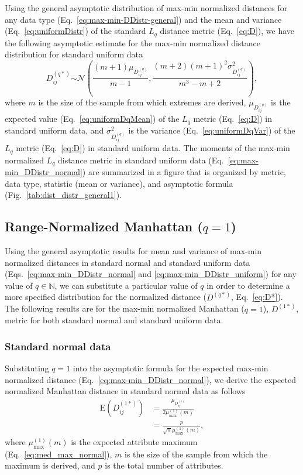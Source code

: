 \documentclass[10pt,letterpaper]{article}
\begin{document}
Using the general asymptotic distribution of max-min normalized distances for any data type (Eq.~\ref{eq:max-min-DDistr-general}) and the mean and variance (Eq.~\ref{eq:uniformDistr}) of the standard $L_q$ distance metric (Eq.~\ref{eq:D}), we have the following asymptotic estimate for the max-min normalized distance distribution for standard uniform data
%
\begin{equation}\label{eq:max-min_DDistr_uniform}
D^{(q*)}_{ij} \overset{.}{\sim} \mathcal{N}\left(\frac{(m+1)\mu_{D^{(q)}_{ij}}}{m-1}, \frac{(m+2)(m+1)^2 \sigma^2_{D^{(q)}_{ij}}}{m^3 - m + 2}\right),
\end{equation}
%
where $m$ is the size of the sample from which extremes are derived, $\mu_{D^{(q)}_{ij}}$ is the expected value (Eq.~\ref{eq:uniformDqMean}) of the $L_q$ metric (Eq.~\ref{eq:D}) in standard uniform data, and $\sigma^2_{D^{(q)}_{ij}}$ is the variance (Eq.~\ref{eq:uniformDqVar}) of the $L_q$ metric (Eq.~\ref{eq:D}) in standard uniform data. The moments of the max-min normalized $L_q$ distance metric in standard uniform data (Eq.~\ref{eq:max-min_DDistr_normal}) are summarized in a figure that is organized by metric, data type, statistic (mean or variance), and asymptotic formula (Fig.~\ref{tab:dist_distr_general1}).

\subsection{Range-Normalized Manhattan \texorpdfstring{($q=1$)}{}}

Using the general asymptotic results for mean and variance of max-min normalized distances in standard normal and standard uniform data (Eqs.~\ref{eq:max-min_DDistr_normal} and \ref{eq:max-min_DDistr_uniform}) for any value of $q \in \mathbb{N}$, we can substitute a particular value of $q$ in order to determine a more specified distribution for the normalized distance ($D^{(q*)}$, Eq.~\ref{eq:D*}). The following results are for the max-min normalized Manhattan ($q = 1$), $D^{(1*)}$, metric for both standard normal and standard uniform data.

\subsubsection{Standard normal data}

Substituting $q=1$ into the asymptotic formula for the expected max-min normalized distance (Eq.~\ref{eq:max-min_DDistr_normal}), we derive the expected normalized Manhattan distance in standard normal data as follows
%
\begin{equation}\label{eq:max-min_mean_normal_manhattan}
\begin{aligned}
\text{E}\left(D^{(1*)}_{ij}\right) &= \frac{\mu_{D^{(1)}_{ij}}}{2\mu^{(1)}_\text{max}(m)} \\
&= \frac{p}{\sqrt{\pi}\mu^{(1)}_\text{max}(m)},
\end{aligned}
\end{equation}
%
where $\mu^{(1)}_\text{max}(m)$ is the expected attribute maximum (Eq.~\ref{eq:med_max_normal}), $m$ is the size of the sample from which the maximum is derived, and $p$ is the total number of attributes.
\end{document}
